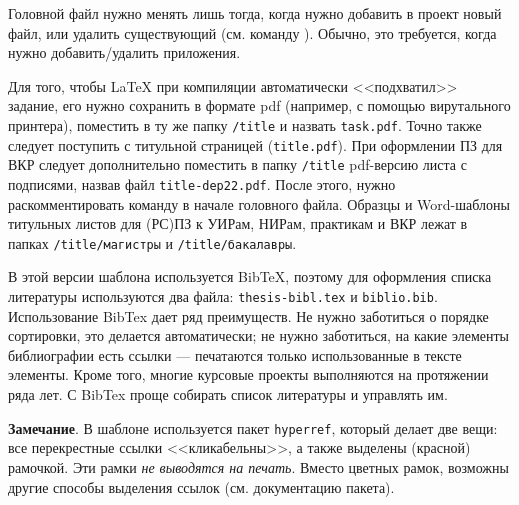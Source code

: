 Головной файл нужно менять лишь тогда, когда нужно добавить в проект новый файл, или удалить существующий (см. команду \verb||). Обычно, это требуется, когда нужно добавить/удалить приложения.

Для того, чтобы \LaTeX{} при компиляции автоматически <<подхватил>> задание, его нужно сохранить в формате pdf (например, с помощью вирутального принтера), поместить в ту же папку \texttt{/title} и назвать \texttt{task.pdf}. Точно также следует поступить с титульной страницей (\texttt{title.pdf}). При оформлении ПЗ для ВКР следует дополнительно поместить в папку \texttt{/title} pdf-версию листа с подписями, назвав файл \texttt{title-dep22.pdf}. После этого, нужно раскомментировать команду \verb|| в начале головного файла. Образцы и Word-шаблоны титульных листов для (РС)ПЗ к УИРам, НИРам, практикам и ВКР лежат в папках \texttt{/title/магистры} и \texttt{/title/бакалавры}.

В этой версии шаблона используется BibTeX, поэтому для оформления списка
литературы используются два файла: \texttt{thesis-bibl.tex} и
\texttt{biblio.bib}. Использование BibTex дает ряд преимуществ. Не нужно
заботиться о порядке сортировки, это делается автоматически; не нужно заботиться,
на какие элементы библиографии есть ссылки --- печатаются только использованные в
тексте элементы. Кроме того, многие курсовые проекты выполняются на протяжении ряда лет. С BibTex проще собирать список литературы и управлять им.

\textbf{Замечание}. В шаблоне используется пакет \texttt{hyperref}, который делает две вещи: все перекрестные ссылки <<кликабельны>>, а также выделены (красной) рамочкой. Эти рамки \textit{не выводятся на печать}. Вместо цветных рамок, возможны другие способы выделения ссылок (см. документацию пакета).
